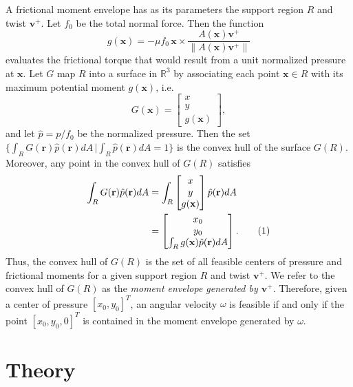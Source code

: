 \documentclass[conference]{IEEEtran}
\newcommand\numberthis{\addtocounter{equation}{1}\tag{\theequation}}
\begin{document}
A frictional moment envelope has as its parameters the support region
$R$ and twist $\mathbf{v}^+$. Let $f_0$ be the total normal
force. Then the function
\begin{equation}
  g(\mathbf{x}) = -\mu f_0\,\mathbf{x}\times \frac{A(\mathbf{x})\mathbf{v}^+}{\lVert A(\mathbf{x})\mathbf{v}^+ \rVert} \label{eq:unit-moment-at-x}
\end{equation}
evaluates the frictional torque that would result from a unit
normalized pressure at $\mathbf{x}$. Let $G$ map $R$ into a surface in
$\mathbb{R}^3$ by associating each point $\mathbf{x} \in R$ with its
maximum potential moment $g(\mathbf{x})$, i.e.
\begin{equation}
G(\mathbf{x}) =
\begin{bmatrix*}
  x\\
  y\\
  g(\mathbf{x})
\end{bmatrix*}, \label{eq:moment-surface-function}
\end{equation}
and let $\hat{p} = p/f_0$ be the normalized pressure. Then the set
$\{\int_RG(\mathbf{r})\hat{p}(\mathbf{r})dA
\,|\int_R\hat{p}(\mathbf{r})dA=1 \}$
is the convex hull of the surface $G(R)$. Moreover, any point in the
convex hull of $G(R)$ satisfies
\begin{align*}
  \int_R G(\mathbf{r}) \hat{p}(\mathbf{r})dA &= \int_R 
  \begin{bmatrix*}
    x\\
    y\\
    g(\mathbf{x})
  \end{bmatrix*}
  \hat{p}(\mathbf{r})dA\\
  &= 
    \begin{bmatrix*}
      x_0\\
      y_0\\
      \int_R g(\mathbf{x}) \hat{p}(\mathbf{r})dA
    \end{bmatrix*}. \numberthis
\end{align*}
Thus, the convex hull of $G(R)$ is the set of all feasible centers of
pressure and frictional moments for a given support region $R$ and
twist $\mathbf{v}^+$. We refer to the convex hull of $G(R)$ as the
\textit{moment envelope generated by $\mathbf{v}^+$}.  Therefore,
given a center of pressure $[x_0,y_0]^T$, an angular velocity $\omega$
is feasible if and only if the point $[x_0,y_0,0]^T$ is contained in
the moment envelope generated by $\omega$.

\section{Theory}\label{sec:theory}
\end{document}
